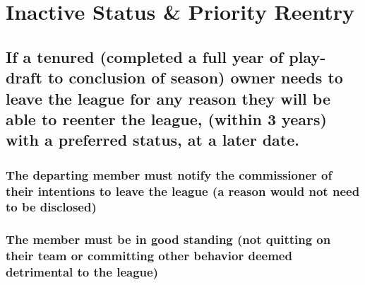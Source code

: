 \documentclass[
]{book}
\begin{document}
\hypertarget{inactive-status-priority-reentry}{%
\section{Inactive Status \& Priority Reentry}\label{inactive-status-priority-reentry}}

\hypertarget{if-a-tenured-completed-a-full-year-of-play-draft-to-conclusion-of-season-owner-needs-to-leave-the-league-for-any-reason-they-will-be-able-to-reenter-the-league-within-3-years-with-a-preferred-status-at-a-later-date.}{%
\subsection{If a tenured (completed a full year of play-draft to conclusion of season) owner needs to leave the league for any reason they will be able to reenter the league, (within 3 years) with a preferred status, at a later date.}\label{if-a-tenured-completed-a-full-year-of-play-draft-to-conclusion-of-season-owner-needs-to-leave-the-league-for-any-reason-they-will-be-able-to-reenter-the-league-within-3-years-with-a-preferred-status-at-a-later-date.}}

\hypertarget{the-departing-member-must-notify-the-commissioner-of-their-intentions-to-leave-the-league-a-reason-would-not-need-to-be-disclosed}{%
\subsubsection{The departing member must notify the commissioner of their intentions to leave the league (a reason would not need to be disclosed)}\label{the-departing-member-must-notify-the-commissioner-of-their-intentions-to-leave-the-league-a-reason-would-not-need-to-be-disclosed}}

\hypertarget{the-member-must-be-in-good-standing-not-quitting-on-their-team-or-committing-other-behavior-deemed-detrimental-to-the-league}{%
\subsubsection{The member must be in good standing (not quitting on their team or committing other behavior deemed detrimental to the league)}\label{the-member-must-be-in-good-standing-not-quitting-on-their-team-or-committing-other-behavior-deemed-detrimental-to-the-league}}
\end{document}
